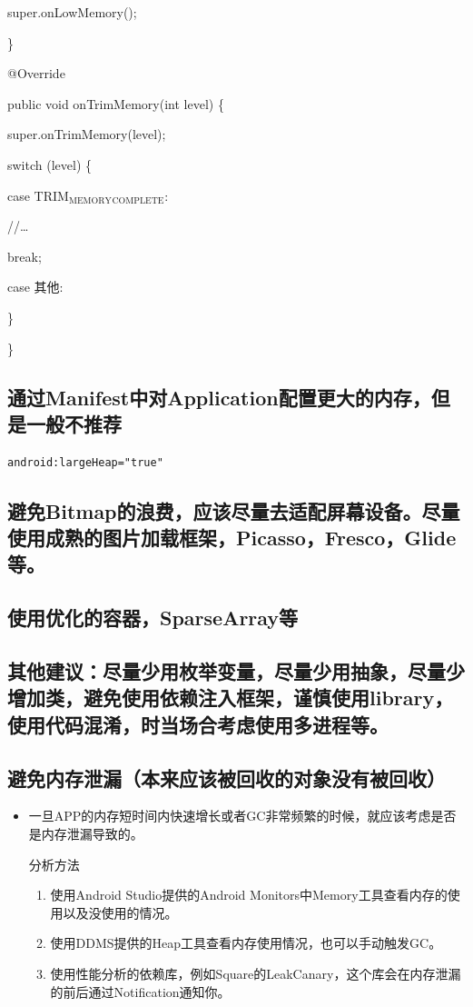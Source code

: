 \documentclass[9pt, b5paaper]{book}
\begin{document}
super.onLowMemory(); 

\}  

@Override 

public void onTrimMemory(int level) \{ 

super.onTrimMemory(level);  


switch (level) \{ 

case TRIM$_{\text{MEMORY}}$$_{\text{COMPLETE}}$: 

//\ldots{} 

break; 

case 其他: 

\} 

\} 
\subsection{通过Manifest中对Application配置更大的内存，但是一般不推荐}
\label{sec-7-1-3}
\begin{verbatim}
android:largeHeap="true"
\end{verbatim}
\subsection{避免Bitmap的浪费，应该尽量去适配屏幕设备。尽量使用成熟的图片加载框架，Picasso，Fresco，Glide等。}
\label{sec-7-1-4}

\subsection{使用优化的容器，SparseArray等}
\label{sec-7-1-5}

\subsection{其他建议：尽量少用枚举变量，尽量少用抽象，尽量少增加类，避免使用依赖注入框架，谨慎使用library，使用代码混淆，时当场合考虑使用多进程等。}
\label{sec-7-1-6}

\subsection{避免内存泄漏（本来应该被回收的对象没有被回收）}
\label{sec-7-1-7}
\begin{itemize}
\item 一旦APP的内存短时间内快速增长或者GC非常频繁的时候，就应该考虑是否是内存泄漏导致的。

分析方法

\begin{enumerate}
\item 使用Android Studio提供的Android Monitors中Memory工具查看内存的使用以及没使用的情况。

\item 使用DDMS提供的Heap工具查看内存使用情况，也可以手动触发GC。

\item 使用性能分析的依赖库，例如Square的LeakCanary，这个库会在内存泄漏的前后通过Notification通知你。
\end{enumerate}
\end{itemize}
\end{document}
